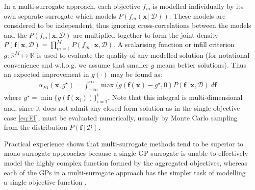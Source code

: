 \documentclass[conference]{IEEEtran}
\newcommand{\parameterspace}{\mathcal{X}}
\newcommand{\nobj}{M}
\DeclareMathOperator*{\argmax}{\arg\!\max}
\newcommand\ei{EI\xspace}
\newcommand\gp{GP\xspace}
\newcommand{\given}{\,|\,}
\newcommand{\bx}{\mathbf{x}}
\newcommand{\bff}{\mathbf{f}}
\newcommand{\data}{\mathcal{D}}
\begin{document}
In a multi-surrogate approach, each objective $f_m$ is modelled
individually by its own separate surrogate which models
$P(f_m(\bx \given \data))$. These models are considered to be independent, thus ignoring cross-correlations between the models and the $P(f_m \given \bx, \data)$ are multiplied together to form the joint density $P(\bff \given \bx, \data) = \prod_{m=1}^\nobj P(f_m \given \bx, \data) $.
A scalarising function or infill criterion
$g : \mathbb{R}^\nobj \mapsto \mathbb{R}$ is used to evaluate the quality
of any modelled solution (for notational convenience and w.l.o.g.{} we assume that smaller $g$ means better solutions). Thus an expected improvement in $g(\cdot)$ may be found as:
\begin{align}
  \label{eq:EI-g}
    \alpha_{\ei}(\bx, g^\star) = \int_{-\infty}^\infty  \max(g(\bff(\bx) -
  g^\star, 0) P(\bff \given \bx,
  \data)\,d\bff
\end{align}
where $g^\star =  \min \{g(\bff(\bx_i))\}_{i=1}^t$.  Note that this
integral is multi-dimensional and, since it does not admit any closed form solution as in the single objective case \eqref{eq:EI},  must be
evaluated numerically, usually by Monte Carlo sampling from the distribution $P(\bff \given \data )$.

Practical experience shows that multi-surrogate methods tend to be superior to mono-surrogate approaches because a single \gp surrogate is unable to effectively model the highly complex function formed by the aggregated objectives, whereas each of the GPs in a multi-surrogate approach has the simpler task of modelling a single objective function \cite{rahat2017alternative}.   




\end{document}
